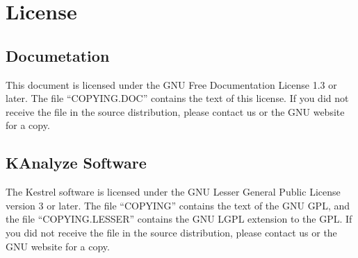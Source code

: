 
\section{License}
\label{section:license}

\subsection{Documetation}

This document is licensed under the GNU Free Documentation License 1.3 or later. The file ``COPYING.DOC'' contains the text of this license. If you did not receive the file in the source distribution, please contact us or the GNU website for a copy.


\subsection{KAnalyze Software}

The Kestrel software is licensed under the GNU Lesser General Public License version 3 or later. The file ``COPYING'' contains the text of the GNU GPL, and the file ``COPYING.LESSER'' contains the GNU LGPL extension to the GPL. If you did not receive the file in the source distribution, please contact us or the GNU website for a copy.
